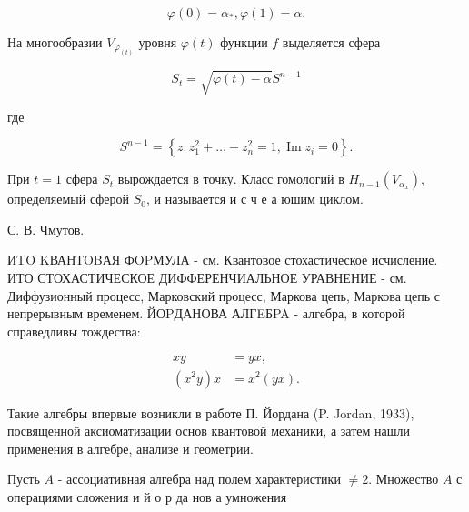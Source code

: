 \documentclass[10pt]{article}
\begin{document}
\[

\varphi(0)=\alpha_{*}, \varphi(1)=\alpha .

\]



На многообразии $V_{\varphi_{(t)}}$ уровня $\varphi(t)$ функции $f$ выделяется сфера



\[

S_{t}=\sqrt{\varphi(t)-\alpha} S^{n-1}

\]



где



\[

S^{n-1}=\left\{z: z_{1}^{2}+\ldots+z_{n}^{2}=1, \operatorname{Im} z_{i}=0\right\} .

\]



При $t=1$ сфера $S_{t}$ вырождается в точку. Класс гомологий в $H_{n-1}\left(V_{\alpha_{x}}\right)$, определяемый сферой $S_{0}$, и называется и с ч е а юшим циклом.



С. В. Чмутов.



ИTO KВАНТOBАЯ ФOPМУЛА - см. Квантовое стохастическое исчисление. ИТО СТОХАСТИЧЕСКОЕ ДИФФЕРЕНЧИАЛЬНОЕ УРАВНЕНИЕ - см. Диффузионный процесс, Марковский процесс, Маркова цепь, Маркова цепь с непрерывным временем. ЙОPДАНОВА АЛГEБPA - алгебра, в которой справедливы тождества:



\[

\begin{aligned}

x y & =y x, \\

\left(x^{2} y\right) x & =x^{2}(y x) .

\end{aligned}

\]



Такие алгебры впервые возникли в работе П. Йордана (P. Jordan, 1933), посвященной аксиоматизации основ квантовой механики, а затем нашли применения в алгебре, анализе и геометрии.



Пусть $A$ - ассоциативная алгебра над полем характеристики $\neq 2$. Множество $A$ с операциями сложения и й о р да нов а умножения
\end{document}
